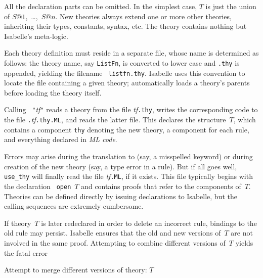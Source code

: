 All the declaration parts can be omitted.  In the simplest case, $T$ is
just the union of $S@1$,~\ldots,~$S@n$.  New theories always extend one
or more other theories, inheriting their types, constants, syntax, etc.
The theory  contains nothing but Isabelle's meta-logic.

Each theory definition must reside in a separate file, whose name is
determined as follows: the theory name, say {\tt ListFn}, is converted to
lower case and {\tt.thy} is appended, yielding the filename {\tt
  listfn.thy}.  Isabelle uses this convention to locate the file containing
a given theory;  automatically loads a theory's
parents before loading the theory itself.

Calling ~{\tt"}{\it tf\/}{\tt"} reads a theory from
the file {\it tf}{\tt.thy}, writes the corresponding {\ML} code to the file
{\tt.}{\it tf}{\tt.thy.ML}, and reads the latter file.  This declares the
{\ML} structure~$T$, which contains a component {\tt thy} denoting the new
theory, a component for each rule, and everything declared in {\it ML
  code}.

Errors may arise during the translation to {\ML} (say, a misspelled keyword)
or during creation of the new theory (say, a type error in a rule).  But if
all goes well, {\tt use_thy} will finally read the file {\it tf}{\tt.ML}, if
it exists.  This file typically begins with the {\ML} declaration {\tt
open}~$T$ and contains proofs that refer to the components of~$T$.
Theories can be defined directly by issuing {\ML} declarations to Isabelle,
but the calling sequences are extremely cumbersome.

If theory~$T$ is later redeclared in order to delete an incorrect rule,
bindings to the old rule may persist.  Isabelle ensures that the old and
new versions of~$T$ are not involved in the same proof.  Attempting to
combine different versions of~$T$ yields the fatal error
\begin{ttbox} 
Attempt to merge different versions of theory: \(T\)
\end{ttbox}

